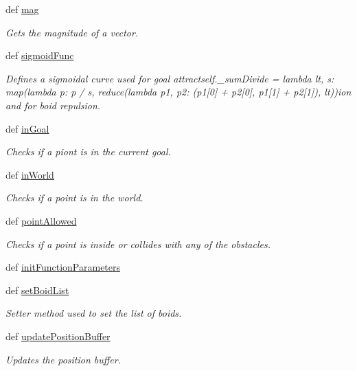 \begin{DoxyCompactItemize}
def \hyperlink{classboid_1_1Boid_a5324650d399f5c850ec7b7bda10eeae7}{mag}
\begin{DoxyCompactList}\small\item\em Gets the magnitude of a vector. \end{DoxyCompactList}\item 
def \hyperlink{classboid_1_1Boid_a492a0ad33a962b15ed94789d59f3b08a}{sigmoid\-Func}
\begin{DoxyCompactList}\small\item\em Defines a sigmoidal curve used for goal attractself.\-\_\-sum\-Divide = lambda lt, s\-: map(lambda p\-: p / s, reduce(lambda p1, p2\-: (p1\mbox{[}0\mbox{]} + p2\mbox{[}0\mbox{]}, p1\mbox{[}1\mbox{]} + p2\mbox{[}1\mbox{]}), lt))ion and for boid repulsion. \end{DoxyCompactList}\item 
def \hyperlink{classboid_1_1Boid_a19392045cdd5e9b46136369028be3c52}{in\-Goal}
\begin{DoxyCompactList}\small\item\em Checks if a piont is in the current goal. \end{DoxyCompactList}\item 
def \hyperlink{classboid_1_1Boid_a321e7b1d2c37c96503e11e00ee87b96f}{in\-World}
\begin{DoxyCompactList}\small\item\em Checks if a point is in the world. \end{DoxyCompactList}\item 
def \hyperlink{classboid_1_1Boid_ae4afdcafb2e1c89390dc0648dae4c6fe}{point\-Allowed}
\begin{DoxyCompactList}\small\item\em Checks if a point is inside or collides with any of the obstacles. \end{DoxyCompactList}\item 
def \hyperlink{classboid_1_1Boid_a0df699bd295042ed4b088d94bc158f17}{init\-Function\-Parameters}
\item 
def \hyperlink{classboid_1_1Boid_ad7296706ec7c12098d3beda40c3fb283}{set\-Boid\-List}
\begin{DoxyCompactList}\small\item\em Setter method used to set the list of boids. \end{DoxyCompactList}\item 
def \hyperlink{classboid_1_1Boid_a0eb922b53c2f4e30dc0d042d1649fd2c}{update\-Position\-Buffer}
\begin{DoxyCompactList}\small\item\em Updates the position buffer. \end{DoxyCompactList}\item 

\end{DoxyCompactItemize}
